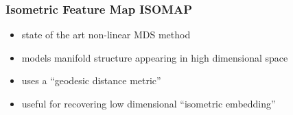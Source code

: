 \documentclass{beamer}
\begin{document}
  \begin{frame}
    \frametitle{Isometric Feature Map ISOMAP}
    \begin{itemize}
    \item state of the art non-linear MDS method
    \item models manifold structure appearing in high dimensional space
    \item uses a ``geodesic distance metric''
    \item useful for recovering low dimensional ``isometric embedding''
    \end{itemize}
  \end{frame}
\end{document}
